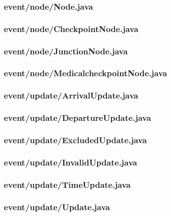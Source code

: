 \documentclass[a4paper, twoside]{article}
\begin{document}
\subsubsection{event/node/Node.java}

\subsubsection{event/node/CheckpointNode.java}

\subsubsection{event/node/JunctionNode.java}

\subsubsection{event/node/MedicalcheckpointNode.java}

\subsubsection{event/update/ArrivalUpdate.java}

\subsubsection{event/update/DepartureUpdate.java}

\subsubsection{event/update/ExcludedUpdate.java}

\subsubsection{event/update/InvalidUpdate.java}

\subsubsection{event/update/TimeUpdate.java}

\subsubsection{event/update/Update.java}

\end{document}
